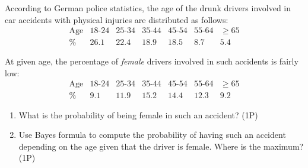 \begin{Problem}
	According to German police statistics, the age of the drunk drivers involved in car accidents with physical injuries are distributed as follows:
	\[
	\begin{array}{c|cccccc}
		\text{Age} & 18\text{-}24 & 25\text{-}34 & 35\text{-}44 & 45\text{-}54 & 55\text{-}64 & \ge 65 \\
		\hline
		\% & 26.1 & 22.4 & 18.9 & 18.5 & 8.7 & 5.4
	\end{array}
	\]
	
	At given age, the percentage of \emph{female} drivers involved in such accidents is fairly low:
	\[
	\begin{array}{c|cccccc}
		\text{Age} & 18\text{-}24 & 25\text{-}34 & 35\text{-}44 & 45\text{-}54 & 55\text{-}64 & \ge 65 \\
		\hline
		\% & 9.1 & 11.9 & 15.2 & 14.4 & 12.3 & 9.2
	\end{array}
	\]
	
	\begin{enumerate}
		\item[(a)] What is the probability of being female in such an accident? (1P)
		\item[(b)] Use Bayes formula to compute the probability of having such an accident depending on the age given that the driver is female. Where is the maximum? (1P)
	\end{enumerate}
\end{Problem}
